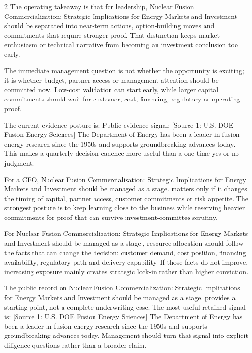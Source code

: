 \documentclass[10pt,a4paper]{article}
\begin{document}
\begin{multicols}{2}
{\small The operating takeaway is that for leadership, Nuclear Fusion Commercialization: Strategic Implications for Energy Markets and Investment should be separated into near-term actions, option-building moves and commitments that require stronger proof. That distinction keeps market enthusiasm or technical narrative from becoming an investment conclusion too early.}\par
{\small The immediate management question is not whether the opportunity is exciting; it is whether budget, partner access or management attention should be committed now. Low-cost validation can start early, while larger capital commitments should wait for customer, cost, financing, regulatory or operating proof.}\par
{\small The current evidence posture is: Public-evidence signal: [Source 1: U.S. DOE Fusion Energy Sciences] The Department of Energy has been a leader in fusion energy research since the 1950s and supports groundbreaking advances today. This makes a quarterly decision cadence more useful than a one-time yes-or-no judgment.}\par
{\small For a CEO, Nuclear Fusion Commercialization: Strategic Implications for Energy Markets and Investment should be managed as a stage. matters only if it changes the timing of capital, partner access, customer commitments or risk appetite. The strongest posture is to keep learning close to the business while reserving heavier commitments for proof that can survive investment-committee scrutiny.}\par
{\small For Nuclear Fusion Commercialization: Strategic Implications for Energy Markets and Investment should be managed as a stage., resource allocation should follow the facts that can change the decision: customer demand, cost position, financing availability, regulatory path and delivery capability. If those facts do not improve, increasing exposure mainly creates strategic lock-in rather than higher conviction.}\par
{\small The public record on Nuclear Fusion Commercialization: Strategic Implications for Energy Markets and Investment should be managed as a stage. provides a starting point, not a complete underwriting case. The most useful retained signal is: [Source 1: U.S. DOE Fusion Energy Sciences] The Department of Energy has been a leader in fusion energy research since the 1950s and supports groundbreaking advances today. Management should turn that signal into explicit diligence questions rather than a broader claim.}\par
\end{multicols}
\label{chap:4:end}
\end{document}

